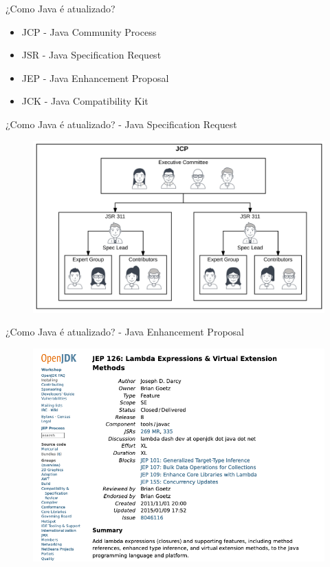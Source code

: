 \documentclass[aspectratio=169]{beamer}
\begin{document}
\begin{frame}[fragile]{¿Como Java é atualizado?}
	\begin{itemize}
		\item JCP - Java Community Process
		\item JSR - Java Specification Request
		\item JEP - Java Enhancement Proposal
		\item JCK - Java Compatibility Kit
	\end{itemize}	
\end{frame}


\begin{frame}[fragile]{¿Como Java é atualizado? - Java Specification Request}
	\begin{figure}
		\centering
		\includegraphics[width=0.9\linewidth]{Images/jcpjsr}
	\end{figure}

\end{frame}

\begin{frame}[fragile]{¿Como Java é atualizado? - Java Enhancement Proposal}
	\begin{figure}
		\centering
		\includegraphics[width=0.9\linewidth]{Images/jep}
	\end{figure}
	
\end{frame}
\end{document}

